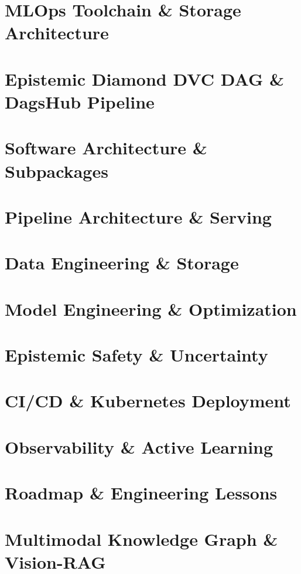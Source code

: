 \documentclass[aspectratio=169]{beamer}
\begin{document}
\section{MLOps Toolchain \& Storage Architecture}


\section{Epistemic Diamond DVC DAG \& DagsHub Pipeline}


\section{Software Architecture \& Subpackages}


\section{Pipeline Architecture \& Serving}


\section{Data Engineering \& Storage}


\section{Model Engineering \& Optimization}


\section{Epistemic Safety \& Uncertainty}


\section{CI/CD \& Kubernetes Deployment}


\section{Observability \& Active Learning}


\section{Roadmap \& Engineering Lessons}


\section{Multimodal Knowledge Graph \& Vision-RAG}

\end{document}
